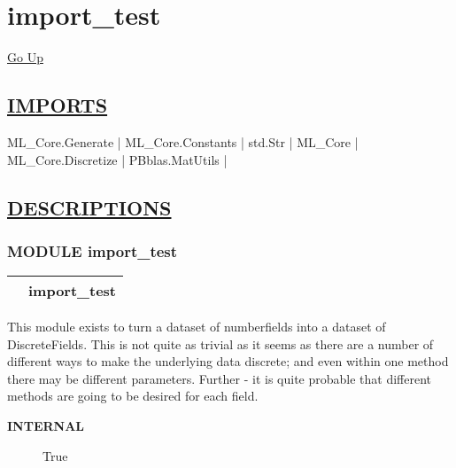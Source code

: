 \chapter*{\color{headfile}
import_test
}
\hypertarget{ecldoc:toc:import_test}{}
\hyperlink{ecldoc:toc:root}{Go Up}

\section*{\underline{\textsf{IMPORTS}}}
\begin{doublespace}
{\large
ML\_Core.Generate |
ML\_Core.Constants |
std.Str |
ML\_Core |
ML\_Core.Discretize |
PBblas.MatUtils |
}
\end{doublespace}

\section*{\underline{\textsf{DESCRIPTIONS}}}
\subsection*{\textsf{\colorbox{headtoc}{\color{white} MODULE}
import\_test}}

\hypertarget{ecldoc:ML_Core.Discretize}{}

{\renewcommand{\arraystretch}{1.5}
\begin{tabularx}{\textwidth}{|>{\raggedright\arraybackslash}l|X|}
\hline
\hspace{0pt}\mytexttt{\color{red} } & \textbf{import\_test} \\
\hline
\end{tabularx}
}

\par





This module exists to turn a dataset of numberfields into a dataset of DiscreteFields. This is not quite as trivial as it seems as there are a number of different ways to make the underlying data discrete; and even within one method there may be different parameters. Further - it is quite probable that different methods are going to be desired for each field.









\par
\begin{description}
\item [\colorbox{tagtype}{\color{white} \textbf{\textsf{INTERNAL}}}] True
\end{description}




